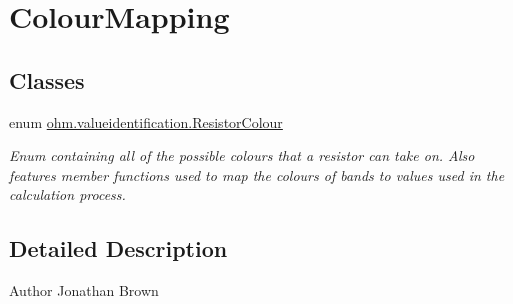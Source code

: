 \hypertarget{group___colour_mapping}{}\section{Colour\+Mapping}
\label{group___colour_mapping}
\subsection*{Classes}
\begin{DoxyCompactItemize}
\item 
enum \hyperlink{enumohm_1_1valueidentification_1_1_resistor_colour}{ohm.\+valueidentification.\+Resistor\+Colour}
\begin{DoxyCompactList}\small\item\em Enum containing all of the possible colours that a resistor can take on. Also features member functions used to map the colours of bands to values used in the calculation process. \end{DoxyCompactList}\end{DoxyCompactItemize}


\subsection{Detailed Description}
\begin{DoxyAuthor}{Author}
Jonathan Brown 
\end{DoxyAuthor}
